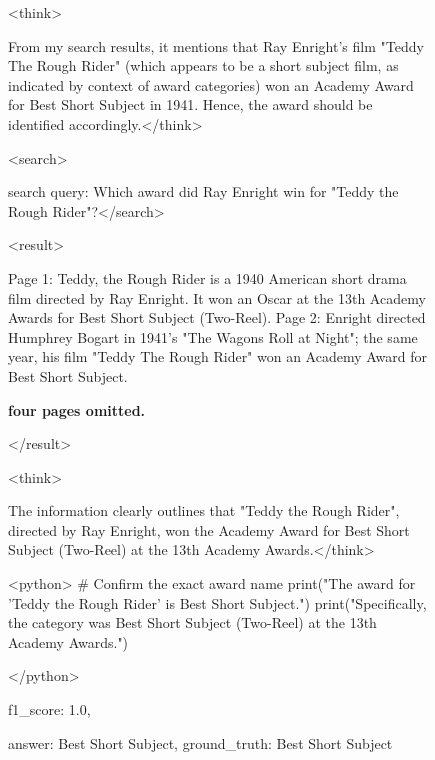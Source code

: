 \documentclass{article}
\begin{document}
\begin{figure}[h]
\begin{tcolorbox}
<think> 

From my search results, it mentions that Ray Enright's film "Teddy The Rough Rider" (which appears to be a short subject film, as indicated by context of award categories) won an Academy Award for Best Short Subject in 1941. Hence, the award should be identified accordingly.</think>  


<search> 

search query: Which award did Ray Enright win for "Teddy the Rough Rider"?</search> 

<result>

Page 1: Teddy, the Rough Rider is a 1940 American short drama film directed by Ray Enright. It won an Oscar at the 13th Academy Awards for Best Short Subject (Two-Reel).
Page 2: Enright directed Humphrey Bogart in 1941's "The Wagons Roll at Night"; the same year, his film "Teddy The Rough Rider" won an Academy Award for Best Short Subject.

\textbf{four pages omitted.}

</result>  

<think> 

The information clearly outlines that "Teddy the Rough Rider", directed by Ray Enright, won the Academy Award for Best Short Subject (Two-Reel) at the 13th Academy Awards.</think>  

<python> 
\# Confirm the exact award name
print("The award for 'Teddy the Rough Rider' is Best Short Subject.")
print("Specifically, the category was Best Short Subject (Two-Reel) at the 13th Academy Awards.")

</python>
 
f1\_score: 1.0,

answer: Best Short Subject, ground\_truth: Best Short Subject
 
\end{tcolorbox} 

\end{figure}

 
\end{document}
